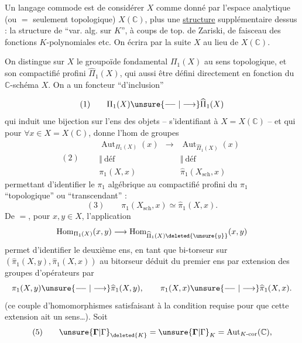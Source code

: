 Un langage commode est de considérer $X$ comme donné par l'espace analytique (ou $=$ seulement topologique) $X(\mathbb C)$, plus une \uline{structure} supplémentaire dessus : la structure de ``var. alg. sur $K$'', à coups de top. de Zariski, de faisceau des fonctions $K$-polynomiales etc. On écrira par la suite $X$ au lieu de $X(\mathbb C)$.

On distingue sur $X$ le groupoïde fondamental $\Pi_1(X)$ au sens topologique, et son compactifié profini $\widehat\Pi_1(X)$, qui   aussi être défini directement en fonction du $\mathbb C$-schéma $X$. On a un foncteur ``d'inclusion''

\[
(1)\qquad\Pi_1(X)\unsure{\relbar\joinrel\relbar|\longrightarrow}\widehat\Pi_1(X)
\]
qui induit une bijection sur l'ens des objets  -- s'identifiant à $X=X(\mathbb C)$ -- et qui  pour $\forall x\in X=X(\mathbb C)$, donne l'hom de groupes
\[
(2)\qquad
\begin{array}{ccc}
\operatorname{Aut}_{\Pi_1(X)}(x)&\longrightarrow&\operatorname{Aut}_{\widehat\Pi_1(X)}(x)\\
\Vert\ \text{déf}&&\Vert\ \text{déf}\\
\pi_1(X,x)&&\widehat\pi_1(X_{\mathrm{sch}},x)
\end{array}
\]
permettant d'identifier le $\pi_1$ algébrique au compactifié profini du $\pi_1$ ``topologique'' ou ``transcendant'' : 
\[
(3)\qquad\pi_1(X_{\mathrm{sch}},x)\simeq\widehat\pi_1(X,x).
\]
De $=$, pour $x,y\in X$, l'application
\[
\operatorname{Hom}_{\Pi_1(X)}(x,y)\longrightarrow\operatorname{Hom}_{\widehat\Pi_1(X)\deleted{\unsure{y}}}(x,y)
\]
permet d'identifier le deuxième ens, en tant que bi-torseur sur $(\widehat\pi_1(X,y),\widehat\pi_1(X,x))$ au bitorseur déduit  du premier ens par extension des groupes d'opérateurs par
\[
\pi_1(X,y)\unsure{\relbar\joinrel\relbar|\longrightarrow}\widehat\pi_1(X,y),\qquad\pi_1(X,x)\unsure{\relbar\joinrel\relbar|\longrightarrow}\widehat\pi_1(X,x).
\]
(ce couple d'homomorphismes satisfaisant  à la condition requise pour que cette extension ait un sens\ldots).
Soit
\[
(5)\qquad\unsure{\mathbf{\Gamma}|\Gamma}_{\deleted{K}}=\unsure{\mathbf{\Gamma}|\Gamma}_K=\operatorname{Aut}_{K\text{-cor}}(\mathbb C),
\]

